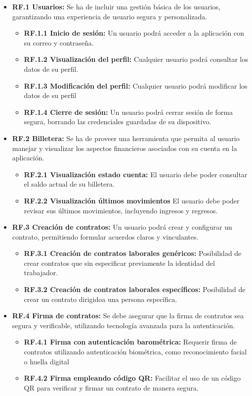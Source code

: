 \begin{itemize}

\item \textbf{RF.1 Usuarios:} Se ha de incluir una gestión básica de los usuarios, garantizando una experiencia de usuario segura y personalizada.
	\begin{itemize}
	\item \textbf{RF.1.1 Inicio de sesión:} Un usuario podrá acceder a la aplicación con su correo y 	contraseña.
	\item \textbf{RF.1.2 Visualización del perfil:} Cualquier usuario podrá consultar los datos de 		su perfil.
	\item \textbf{RF.1.3 Modificación del perfil:} Cualquier usuario podrá modificar los datos de su 	perfil
	\item \textbf{RF.1.4 Cierre de sesión:} Un usuario podrá cerrar sesión de forma segura, borrando 	las credenciales guardadas de su dispositivo.
	\end{itemize}
	
\item \textbf{RF.2 Billetera:} Se ha de proveer una herramienta que permita al usuario manejar y visualizar los aspectos financieros asociados con su cuenta en la aplicación.

	\begin{itemize}
	\item \textbf{RF.2.1 Visualización estado cuenta:} El usuario debe poder consultar el saldo	 		actual de su billetera.
	\item \textbf{RF.2.2 Visualización últimos movimientos} El usuario debe poder revisar sus 				últimos movimientos, incluyendo ingresos y regresos.
	\end{itemize}	
	
\item \textbf{RF.3 Creación de contratos:} Un usuario podrá crear y configurar un contrato, permitiendo formular acuerdos claros y vinculantes.
	\begin{itemize}
	\item \textbf{RF.3.1 Creación de contratos laborales genéricos:} Posibilidad de crear contratos		que sin especificar previamente la identidad del trabajador.
	\item \textbf{RF.3.2 Creación de contratos laborales específicos:} Posibilidad de crear un 			contrato dirigidoa una persona específica.
	\end{itemize}
	
\item \textbf{RF.4 Firma de contratos:} Se debe asegurar que la firma de contratos sea segura y verificable, utilizando tecnología avanzada para la autenticación.
	\begin{itemize}
	\item \textbf{RF.4.1 Firma con autenticación barométrica:} Requerir firma de contratos 				utilizando autenticación biométrica, como reconocimiento facial o huella digital
	\item \textbf{RF.4.2 Firma empleando código QR:} Facilitar el uso de un código QR para verificar 	y firmar un contrato de manera segura.
	\end{itemize}
	

\end{itemize}
